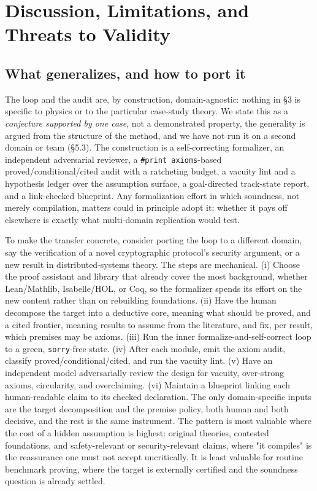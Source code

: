 \documentclass[11pt]{article}
\begin{document}
\section{Discussion, Limitations, and Threats to Validity}

\subsection{What generalizes, and how to port it}

The loop and the audit are, by construction, domain-agnostic: nothing in §3 is specific to physics or
to the particular case-study theory. We state this as a \emph{conjecture supported by one case}, not a
demonstrated property, the generality is argued from the structure of the method, and we have not
run it on a second domain or team (§5.3). The construction is a self-correcting formalizer, an
independent adversarial reviewer, a \texttt{\#print axioms}-based proved/conditional/cited audit with a
ratcheting budget, a vacuity lint and a hypothesis ledger over the assumption surface, a goal-directed
track-state report, and a link-checked blueprint. Any formalization effort in which soundness, not
merely compilation, matters could in principle adopt it; whether it pays off elsewhere is exactly
what multi-domain replication would test.

To make the transfer concrete, consider porting the loop to a different domain, say the verification
of a novel cryptographic protocol's security argument, or a new result in distributed-systems
theory. The steps are mechanical. (i) Choose the proof assistant and library that already cover the
most background, whether Lean/Mathlib, Isabelle/HOL, or Coq, so the formalizer spends its effort on
the new content rather than on rebuilding foundations. (ii) Have the human decompose the target into
a deductive core, meaning what should be proved, and a cited frontier, meaning results to assume
from the literature, and fix, per result, which premises may be axioms. (iii) Run the inner
formalize-and-self-correct loop to a green, \texttt{sorry}-free state. (iv) After each module, emit the
axiom audit, classify proved/conditional/cited, and run the vacuity lint. (v) Have an independent
model adversarially review the design for vacuity, over-strong axioms, circularity, and overclaiming.
(vi) Maintain a blueprint linking each human-readable claim to its checked declaration. The only
domain-specific inputs are the target decomposition and the premise policy, both human and both
decisive, and the rest is the same instrument. The pattern is most valuable where the cost of a
hidden assumption is highest: original theories, contested foundations, and safety-relevant or
security-relevant claims, where "it compiles" is the reassurance one must not accept uncritically.
It is least valuable for routine benchmark proving, where the target is externally certified and the
soundness question is already settled.
\end{document}
